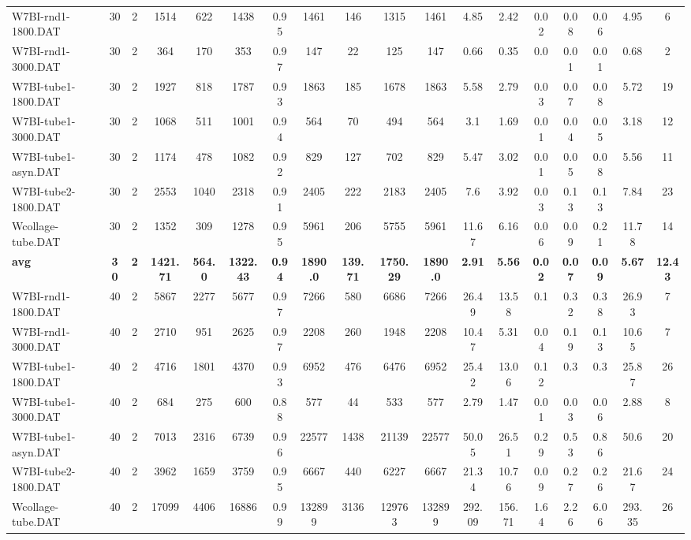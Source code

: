 \begin{sidewaystable}[h]
{\begin{tabular}{lccccccccccccccccc}
W7BI-rnd1-1800.DAT & 30 & 2 & 1514 & 622 & 1438 & 0.95 & 1461 & 146 & 1315 & 1461 & 4.85 & 2.42 & 0.02 & 0.08 & 0.06 & 4.95 & 6\\
W7BI-rnd1-3000.DAT & 30 & 2 & 364 & 170 & 353 & 0.97 & 147 & 22 & 125 & 147 & 0.66 & 0.35 & 0.0 & 0.01 & 0.01 & 0.68 & 2\\
W7BI-tube1-1800.DAT & 30 & 2 & 1927 & 818 & 1787 & 0.93 & 1863 & 185 & 1678 & 1863 & 5.58 & 2.79 & 0.03 & 0.07 & 0.08 & 5.72 & 19\\
W7BI-tube1-3000.DAT & 30 & 2 & 1068 & 511 & 1001 & 0.94 & 564 & 70 & 494 & 564 & 3.1 & 1.69 & 0.01 & 0.04 & 0.05 & 3.18 & 12\\
W7BI-tube1-asyn.DAT & 30 & 2 & 1174 & 478 & 1082 & 0.92 & 829 & 127 & 702 & 829 & 5.47 & 3.02 & 0.01 & 0.05 & 0.08 & 5.56 & 11\\
W7BI-tube2-1800.DAT & 30 & 2 & 2553 & 1040 & 2318 & 0.91 & 2405 & 222 & 2183 & 2405 & 7.6 & 3.92 & 0.03 & 0.13 & 0.13 & 7.84 & 23\\
Wcollage-tube.DAT & 30 & 2 & 1352 & 309 & 1278 & 0.95 & 5961 & 206 & 5755 & 5961 & 11.67 & 6.16 & 0.06 & 0.09 & 0.21 & 11.78 & 14\\
\cline{1-18} \textbf{avg} & \textbf{30} & \textbf{2} & \textbf{1421.71} & \textbf{564.0} & \textbf{1322.43} & \textbf{0.94} & \textbf{1890.0} & \textbf{139.71} & \textbf{1750.29} & \textbf{1890.0} & \textbf{2.91} & \textbf{5.56} & \textbf{0.02} & \textbf{0.07} & \textbf{0.09} & \textbf{5.67} & \textbf{12.43} \\ \cline{1-18}
W7BI-rnd1-1800.DAT & 40 & 2 & 5867 & 2277 & 5677 & 0.97 & 7266 & 580 & 6686 & 7266 & 26.49 & 13.58 & 0.1 & 0.32 & 0.38 & 26.93 & 7\\
W7BI-rnd1-3000.DAT & 40 & 2 & 2710 & 951 & 2625 & 0.97 & 2208 & 260 & 1948 & 2208 & 10.47 & 5.31 & 0.04 & 0.19 & 0.13 & 10.65 & 7\\
W7BI-tube1-1800.DAT & 40 & 2 & 4716 & 1801 & 4370 & 0.93 & 6952 & 476 & 6476 & 6952 & 25.42 & 13.06 & 0.12 & 0.3 & 0.3 & 25.87 & 26\\
W7BI-tube1-3000.DAT & 40 & 2 & 684 & 275 & 600 & 0.88 & 577 & 44 & 533 & 577 & 2.79 & 1.47 & 0.01 & 0.03 & 0.06 & 2.88 & 8\\
W7BI-tube1-asyn.DAT & 40 & 2 & 7013 & 2316 & 6739 & 0.96 & 22577 & 1438 & 21139 & 22577 & 50.05 & 26.51 & 0.29 & 0.53 & 0.86 & 50.6 & 20\\
W7BI-tube2-1800.DAT & 40 & 2 & 3962 & 1659 & 3759 & 0.95 & 6667 & 440 & 6227 & 6667 & 21.34 & 10.76 & 0.09 & 0.27 & 0.26 & 21.67 & 24\\
Wcollage-tube.DAT & 40 & 2 & 17099 & 4406 & 16886 & 0.99 & 132899 & 3136 & 129763 & 132899 & 292.09 & 156.71 & 1.64 & 2.26 & 6.06 & 293.35 & 26\\

\end{tabular}}
\end{sidewaystable}
